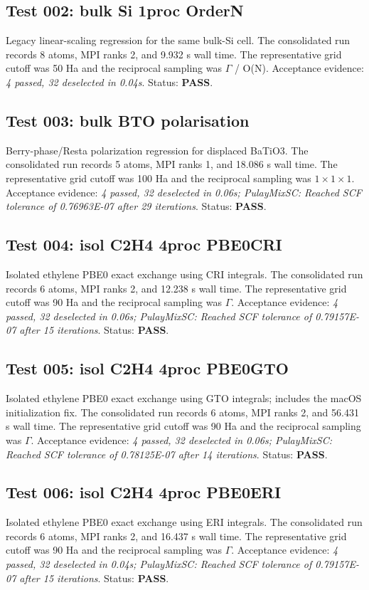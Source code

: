\documentclass[aps,prb,preprint,superscriptaddress,longbibliography,floatfix]{revtex4-2}
\begin{document}
\subsection{Test 002: bulk Si 1proc OrderN}
Legacy linear-scaling regression for the same bulk-Si cell. The consolidated run records 8 atoms, MPI ranks 2, and 9.932 s wall time. The representative grid cutoff was 50 Ha and the reciprocal sampling was $\Gamma$ / O(N). Acceptance evidence: \emph{4 passed, 32 deselected in 0.04s}. Status: \textbf{PASS}.

\subsection{Test 003: bulk BTO polarisation}
Berry-phase/Resta polarization regression for displaced BaTiO3. The consolidated run records 5 atoms, MPI ranks 1, and 18.086 s wall time. The representative grid cutoff was 100 Ha and the reciprocal sampling was $1\times1\times1$. Acceptance evidence: \emph{4 passed, 32 deselected in 0.06s; PulayMixSC: Reached SCF tolerance of 0.76963E-07 after 29 iterations}. Status: \textbf{PASS}.

\subsection{Test 004: isol C2H4 4proc PBE0CRI}
Isolated ethylene PBE0 exact exchange using CRI integrals. The consolidated run records 6 atoms, MPI ranks 2, and 12.238 s wall time. The representative grid cutoff was 90 Ha and the reciprocal sampling was $\Gamma$. Acceptance evidence: \emph{4 passed, 32 deselected in 0.06s; PulayMixSC: Reached SCF tolerance of 0.79157E-07 after 15 iterations}. Status: \textbf{PASS}.

\subsection{Test 005: isol C2H4 4proc PBE0GTO}
Isolated ethylene PBE0 exact exchange using GTO integrals; includes the macOS initialization fix. The consolidated run records 6 atoms, MPI ranks 2, and 56.431 s wall time. The representative grid cutoff was 90 Ha and the reciprocal sampling was $\Gamma$. Acceptance evidence: \emph{4 passed, 32 deselected in 0.06s; PulayMixSC: Reached SCF tolerance of 0.78125E-07 after 14 iterations}. Status: \textbf{PASS}.

\subsection{Test 006: isol C2H4 4proc PBE0ERI}
Isolated ethylene PBE0 exact exchange using ERI integrals. The consolidated run records 6 atoms, MPI ranks 2, and 16.437 s wall time. The representative grid cutoff was 90 Ha and the reciprocal sampling was $\Gamma$. Acceptance evidence: \emph{4 passed, 32 deselected in 0.04s; PulayMixSC: Reached SCF tolerance of 0.79157E-07 after 15 iterations}. Status: \textbf{PASS}.
\end{document}
